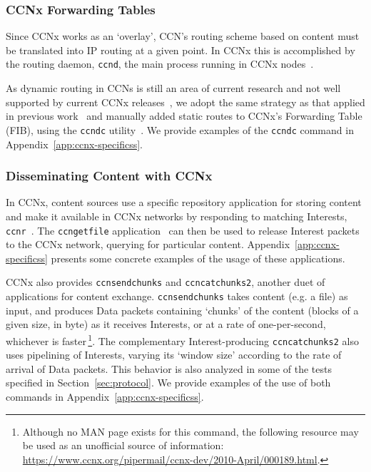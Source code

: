 \subsubsection{CCNx Forwarding Tables}
\label{subsubsec:fibs}

Since CCNx works as an `overlay', CCN's routing scheme based on content must be 
translated into IP routing at a given point. In CCNx this is accomplished 
by the routing daemon, \verb+ccnd+, the main process running in CCNx 
nodes~\cite{website:ccnx-commands}.\vertbreak

As dynamic routing in CCNs is still an area of current research 
and not well supported by current CCNx releases~\cite{Wang2012,Hoque:2013:NNL:2491224.2491231}, 
we adopt the same strategy as that applied in previous work~\cite{Wahlisch2012, Vahlenkamp2012} 
and manually added static routes to CCNx's Forwarding Table (FIB), using the 
\verb+ccndc+ utility~\cite{website:ccnx-commands}. We provide examples of 
the \verb+ccndc+ command in Appendix~\ref{app:ccnx-specificss}.

\subsubsection{Disseminating Content with CCNx}
\label{subsubsection:disseminating-ccnx}

In CCNx, content sources use a specific repository application for storing 
content and make it available in CCNx networks by responding to 
matching Interests, \verb+ccnr+~\cite{website:ccnx-commands}. The \verb+ccngetfile+ application~\cite{website:ccnx-commands} 
can then be used to release Interest packets to the CCNx network, querying 
for particular content. Appendix~\ref{app:ccnx-specificss} presents some concrete examples 
of the usage of these applications.\vertbreak

CCNx also provides \verb+ccnsendchunks+ and \verb+ccncatchunks2+, another duet 
of applications for content exchange. \verb+ccnsendchunks+ takes content (e.g. 
a file) as input, and produces Data packets containing `chunks' of the content 
(blocks of a given size, in byte) as it receives Interests, or at a rate of 
one-per-second, whichever is faster\,\footnote{Although no 
MAN page exists for this command, the following resource may be used as an unofficial 
source of information: \url{https://www.ccnx.org/pipermail/ccnx-dev/2010-April/000189.html}.}. 
The complementary Interest-producing \verb+ccncatchunks2+ also uses pipelining 
of Interests, varying 
its `window size' according to the rate of arrival of Data packets. This 
behavior is also analyzed in some of the tests specified in 
Section~\ref{sec:protocol}. We provide examples of the use 
of both commands in Appendix~\ref{app:ccnx-specificss}.\vertbreak

